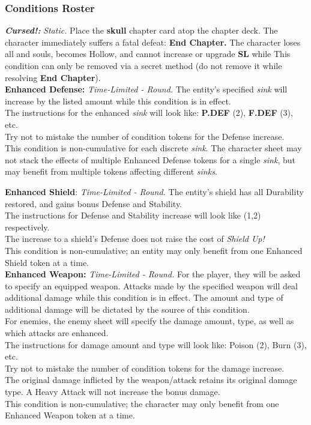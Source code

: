 \documentclass[12pt]{article}
\begin{document}
\begin{multicols*}{2}
\subsubsection{Conditions Roster}
\textbf{\emph{Cursed!:}} \hypertarget{Cursed!}{}\emph{Static.} Place the \textbf{skull} chapter card atop the chapter deck. The character immediately suffers a fatal defeat: \textbf{End Chapter.} The character loses all  and souls, becomes Hollow, and cannot increase  or upgrade \textbf{SL} while  This condition can only be removed via a secret method (do not remove it while resolving \textbf{End Chapter}).\\

\textbf{Enhanced Defense:} \emph{Time-Limited - Round.} The entity’s specified \emph{sink} will increase by the listed amount while this condition is in effect.\\
The instructions for the enhanced \emph{sink} will look like: \textbf{P.DEF} (2), \textbf{F.DEF} (3), etc.\\
Try not to mistake the number of condition tokens for the Defense increase.\\
This condition is non-cumulative for each discrete \emph{sink}. The character sheet may not stack the effects of multiple Enhanced Defense tokens for a single \emph{sink}, but may benefit from multiple tokens affecting different \emph{sinks}.

\textbf{Enhanced Shield}: \emph{Time-Limited - Round.} The entity’s shield has all Durability restored, and gains bonus Defense and Stability.\\
The instructions for Defense and Stability increase will look like (1,2) respectively.\\
The increase to a shield’s Defense does not raise the cost of \emph{Shield Up!}\\
This condition is non-cumulative; an entity may only benefit from one Enhanced Shield token at a time.\\

\textbf{Enhanced Weapon:} \emph{Time-Limited - Round.} For the player, they will be asked to specify an equipped weapon. Attacks made by the specified weapon will deal additional damage while this condition is in effect. The amount and type of additional damage will be dictated by the source of this condition.\\
For enemies, the enemy sheet will specify the damage amount, type, as well as which attacks are enhanced.\\
The instructions for damage amount and type will look like: Poison (2), Burn (3), etc.\\
Try not to mistake the number of condition tokens for the damage increase.\\
The original damage inflicted by the weapon/attack retains its original damage type. A Heavy Attack will not increase the bonus damage.\\
This condition is non-cumulative; the character may only benefit from one Enhanced Weapon token at a time.\\


\end{multicols*}
\end{document}
